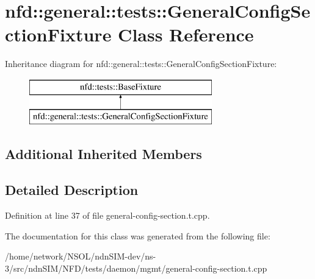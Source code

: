\hypertarget{classnfd_1_1general_1_1tests_1_1GeneralConfigSectionFixture}{}\section{nfd\+:\+:general\+:\+:tests\+:\+:General\+Config\+Section\+Fixture Class Reference}
\label{classnfd_1_1general_1_1tests_1_1GeneralConfigSectionFixture}
Inheritance diagram for nfd\+:\+:general\+:\+:tests\+:\+:General\+Config\+Section\+Fixture\+:\begin{figure}[H]
\begin{center}
\leavevmode
\includegraphics[height=2.000000cm]{classnfd_1_1general_1_1tests_1_1GeneralConfigSectionFixture}
\end{center}
\end{figure}
\subsection*{Additional Inherited Members}


\subsection{Detailed Description}


Definition at line 37 of file general-\/config-\/section.\+t.\+cpp.



The documentation for this class was generated from the following file\+:\begin{DoxyCompactItemize}
\item 
/home/network/\+N\+S\+O\+L/ndn\+S\+I\+M-\/dev/ns-\/3/src/ndn\+S\+I\+M/\+N\+F\+D/tests/daemon/mgmt/general-\/config-\/section.\+t.\+cpp\end{DoxyCompactItemize}
